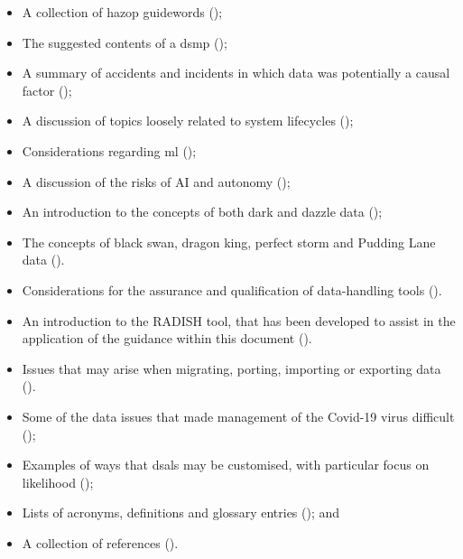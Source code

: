 \begin{itemize}
\begin{itemize}
      \item A collection of \gls{hazop} guidewords ();
      \item The suggested contents of a \gls{dsmp} ();
      \item A summary of accidents and incidents in which data was potentially a causal factor ();
      \item A discussion of topics loosely related to system lifecycles ();
      \item Considerations regarding \gls{ml} ();
      \item A discussion of the risks of AI and autonomy ();
      \item An introduction to the concepts of both dark and dazzle data ();
      \item The concepts of black swan, dragon king, perfect storm and Pudding Lane data ().
      \item Considerations for the assurance and qualification of data-handling tools ().
      \item An introduction to the RADISH tool, that has been developed to assist in the application of the guidance within this document ().
      \item Issues that may arise when migrating, porting, importing or exporting data ().            
      \item Some of the data issues that made management of the Covid-19 virus difficult ();
      \item Examples of ways that \glspl{dsal} may be customised, with particular focus on likelihood ();
      \item Lists of acronyms, definitions and glossary entries (); and
      \item A collection of references ().
    \end{itemize}
\end{itemize}

%
%
\makeatletter		%
\dsiwg@intblankpage
\makeatother
\setcounter{tocdepth}{2}
\tableofcontents

%
%
\listoftables
%
\listoffigures
\cleardoublepage%
